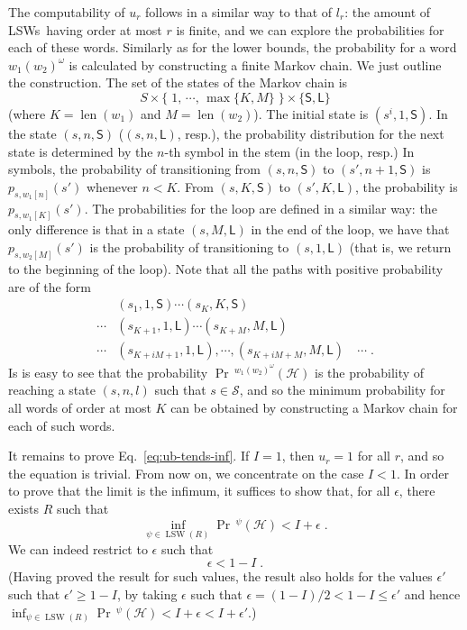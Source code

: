 \documentclass[final,3p,times,twocolumn]{elsarticle}
\theoremstyle{plain}
\theoremstyle{definition}
\newcommand{\state}{s}
\newcommand{\states}{S}
\newcommand{\initstate}{\state^{i}}
\newcommand{\reachset}{\mathcal{S}}
\newcommand{\prob}[3]{p_{{#1},{#2}}(#3)}
\newcommand{\fword}{w}
\newcommand{\infimum}{I}
\newcommand{\phit}{\mathcal{H}}
\DeclareMathOperator{\lenWord}{len}
\newcommand{\len}[1]{\lenWord({#1})}
\newcommand{\iword}{\psi}
\DeclareMathOperator{\prWord}{Pr}
\newcommand{\lb}{l}
\newcommand{\ub}{u}
\newcommand{\iter}{r}
\newcommand{\recallEquation}[1]{Eq.~\ref{#1}}
\newcommand{\bigiter}{R}
\newcommand{\lsws}{LSWs}
\DeclareMathOperator{\lswWord}{LSW}
\newcommand{\alllsw}[1]{\lswWord({#1})}
\newcommand{\pr}{\prWord\,\!}
\begin{document}
The computability of $\ub_{\iter}$ follows in a similar way to that of
$\lb_{r}$: the amount of \lsws\ having order at most $\iter$ is finite, and we
can explore the probabilities for each of these words. Similarly as for the
lower bounds, the probability for a word $w_{1}(w_{2})^{\omega}$ is calculated
by constructing a finite Markov chain. We just outline the construction. The
set of the states of the Markov chain is
\newcommand{\isstem}{\mathsf{S}}
\newcommand{\isloop}{\mathsf{L}}
\[ \states
	\times \{ \; 1, \, \cdots, \, \max \{ K, M \} \; \}
	\times \{ \isstem, \isloop \} \]
(where $K = \len{w_{1}}$ and $M = \len{w_{2}}$).
The initial state is $(\initstate,1,\isstem)$. In the state $(s,n,\isstem)$
($(s,n,\isloop)$, resp.), the probability distribution for the next state is
determined by the $n$-th symbol in the stem (in the loop, resp.) In symbols, the
probability of transitioning from $(\state,n,\isstem)$ to
$(\state',n+1,\isstem)$ is $\prob{\state}{\fword_{1}[n]}{\state'}$ whenever
$n < K$. From $(\state,K,\isstem)$ to
$(\state',K,\isloop)$, the probability is
$\prob{\state}{\fword_{1}[K]}{\state'}$. The probabilities for the loop are
defined in a similar way: the only difference is that in a state
$(s,M,\isloop)$ in the end of the loop, we have that
$\prob{\state}{\fword_{2}[M]}{\state'}$ is the probability of transitioning to
$(s,1,\isloop)$ (that is, we return to the beginning of the loop). Note that
all the paths with positive probability are of the form
\[
\begin{array}{cl}
 & (\state_{1},1,\isstem) \cdots (\state_{K},K,\isstem) \\
\cdots & (\state_{K+1},1,\isloop) \cdots (\state_{K+M},M,\isloop) \\
\cdots & (\state_{K+iM+1},1,\isloop),\cdots,(\state_{K+iM+M},M,\isloop)
				\quad \cdots \; .
\end{array}
\]
Is is easy to see that the probability
$\pr^{w_{1}(w_{2})^{\omega}}(\phit)$ is the probability of reaching a state
$(s,n,l)$ such that $s \in \reachset$, and so the minimum probability for all
words of order at most $K$ can be obtained by constructing a Markov chain for
each of such words.

It remains to prove \recallEquation{eq:ub-tends-inf}.
If $\infimum = 1$, then $\ub_{\iter} = 1$ for all $\iter$, and so the equation
is trivial. From now on, we concentrate on the case $\infimum < 1$. In order to
prove that the limit is the infimum, it suffices to show that, for all
$\epsilon$, there exists $\bigiter$ such that
\begin{equation}
\label{ineq:desired-lim}
\inf_{\iword \in \alllsw{\bigiter}} \pr^{\iword}(\phit)
												< \infimum+\epsilon \; .
\end{equation}
We can indeed restrict to $\epsilon$ such that
\begin{equation}
\label{ineq:restrict-epsilon}
\epsilon < 1-\infimum \; .
\end{equation}
(Having proved the result for such values, the result also holds for the values
$\epsilon'$ such that $\epsilon' \geq 1-\infimum$, by taking $\epsilon$ such
that  $\epsilon = (1-\infimum)/2 < 1-\infimum \leq \epsilon'$ and hence
$\inf_{\iword \in \alllsw{\bigiter}} \pr^{\iword}(\phit)
					< \infimum+\epsilon < \infimum+\epsilon'$.)
\end{document}
